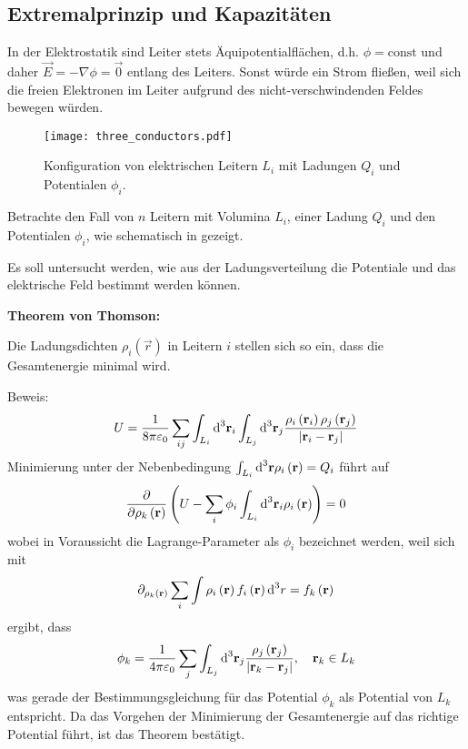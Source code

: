 \subsection{Extremalprinzip und Kapazitäten}

\begin{formal}
	In der Elektrostatik sind Leiter stets Äquipotentialflächen, d.h. $\phi =\text{const}$ und daher $\vec {E}=-\nabla \phi =\vec {0}$ entlang des Leiters. Sonst würde ein Strom fließen, weil sich die freien Elektronen im Leiter aufgrund des nicht-verschwindenden Feldes bewegen würden.
\end{formal}

\begin{figure}[htb]
	\centering
	\texttt{[image: three\_conductors.pdf]}
	\caption{Konfiguration von elektrischen Leitern $L_i$ mit Ladungen $Q_i$ und Potentialen $\phi_i$. }
	\label{fig:three_conductors}
\end{figure}

Betrachte den Fall von $n$ Leitern mit Volumina $L_{i}$, einer Ladung $Q_{i}$ und den Potentialen $\phi _{i}$, wie schematisch in  gezeigt.

Es soll untersucht werden, wie aus der Ladungsverteilung die Potentiale und das elektrische Feld bestimmt werden können.
\begin{formal}
		\textbf{Theorem von Thomson:}
		
		Die Ladungsdichten $\rho _{i}\left(\vec {r}\right)$ in Leitern $i$ stellen sich so ein, dass die Gesamtenergie minimal wird.
\end{formal}
Beweis:
\begin{equation*}
	U=\frac{1}{8\pi \varepsilon _{0}}\sum _{ij}\int _{L_{i}}\text{d} ^{3}\mathbf{r}_{i}\int _{L_{j}}\text{d} ^{3}\mathbf{r}_{j}\frac{\rho _{i}\left(\mathbf{r}_{i}\right)\rho _{j}\left(\mathbf{r}_{j}\right)}{\left| \mathbf{r}_{i}-\mathbf{r}_{j}\right| }
\end{equation*}
Minimierung unter der Nebenbedingung $\int _{{L_{i}}}\text{d} ^{3}\mathbf{r}\rho _{i}\left(\mathbf{r}\right)=Q_{i}$ führt auf
\begin{equation*}
	\frac{\partial }{\partial \rho _{k}\left(\mathbf{r}\right)}\left(U-\sum _{i}\phi _{i}\int _{L_{i}}\text{d} ^{3}\mathbf{r}_{i}\rho _{i}\left(\mathbf{r}\right)\right)=0
\end{equation*}
wobei in Voraussicht die Lagrange-Parameter als $\phi _{i}$ bezeichnet werden, weil sich mit
\begin{equation*}
    \partial _{{\rho _{k}}\left(\mathbf{r}\right)}\sum _{i}\int \rho _{i}\left(\mathbf{r}\right)f_{i}\left(\mathbf{r}\right)\text{d} ^{3}r=f_{k}\left(\mathbf{r}\right)
\end{equation*}
ergibt, dass
\begin{equation*}
	\phi _{k}=\frac{1}{4\pi \varepsilon _{0}}\sum _{j}\int _{L_{j}}\text{d} ^{3}\mathbf{r}_{j}\frac{\rho _{j}\left(\mathbf{r}_{j}\right)}{\left| \mathbf{r}_{k}-\mathbf{r}_{j}\right| },\quad \mathbf{r}_{k}\in L_{k}
\end{equation*}
was gerade der Bestimmungsgleichung für das Potential $\phi _{k}$ als Potential von $L_{k}$ entspricht. Da das Vorgehen der Minimierung der Gesamtenergie auf das richtige Potential führt, ist das Theorem bestätigt.



